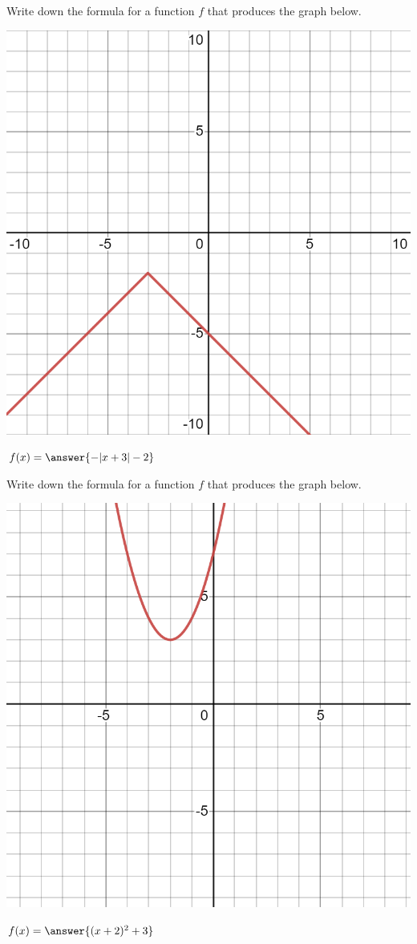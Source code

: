\documentclass{ximera}
\author{Kenneth Berglund}
\begin{document}
 
\begin{exercise}
Write down the formula for a function $f$ that produces the graph below. 

\includegraphics[width=1\linewidth]{FT25graph.png}

$f(x) = \answer{-|x + 3| - 2}$

\end{exercise}

\begin{exercise}
Write down the formula for a function $f$ that produces the graph below. 

\includegraphics[width=1\linewidth]{FT25graph2.png}

$f(x) = \answer{(x + 2)^2 + 3}$

\end{exercise}
\end{document}
